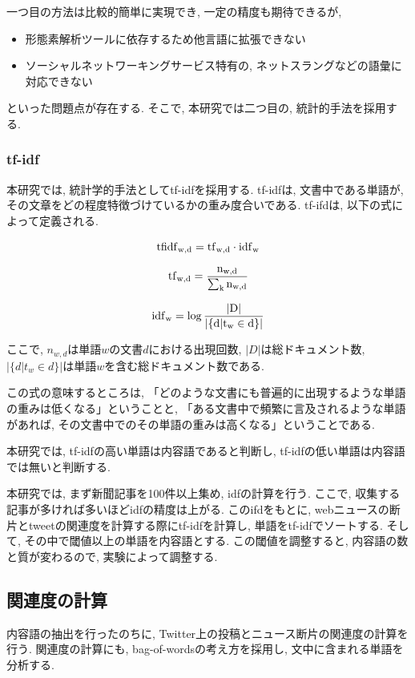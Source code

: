 \documentclass[12pt]{jarticle}
\begin{document}
一つ目の方法は比較的簡単に実現でき, 一定の精度も期待できるが, 
\begin{itemize}
  \item 形態素解析ツールに依存するため他言語に拡張できない
  \item ソーシャルネットワーキングサービス特有の, ネットスラングなどの語彙に対応できない
\end{itemize}
といった問題点が存在する. そこで, 本研究では二つ目の, 統計的手法を採用する. 

\subsubsection{tf-idf}
本研究では, 統計学的手法としてtf-idf\cite{tfidf}を採用する. tf-idfは, 文書中である単語が, その文章をどの程度特徴づけているかの重み度合いである. tf-ifdは, 以下の式によって定義される. 

\begin{equation}
  \rm{tfidf}_{w,d} = \rm{tf}_{w,d} \cdot \rm{idf}_{w}
\end{equation}

\begin{equation}
  \rm{tf}_{w, d} = \frac{n_{w,d}}{\sum_k n_{w,d}}
\end{equation}

\begin{equation}
  \rm{idf}_{w} = \log{\frac{|D|}{|\{d|t_w \in d\}|}}
\end{equation}

ここで, $n_{w,d}$は単語$w$の文書$d$における出現回数, $|D|$は総ドキュメント数, $|\{d|t_w \in d\}|$は単語$w$を含む総ドキュメント数である. 

この式の意味するところは, 「どのような文書にも普遍的に出現するような単語の重みは低くなる」ということと, 「ある文書中で頻繁に言及されるような単語があれば, その文書中でのその単語の重みは高くなる」ということである. 

本研究では, tf-idfの高い単語は内容語であると判断し, tf-idfの低い単語は内容語では無いと判断する. 

本研究では, まず新聞記事を100件以上集め, idfの計算を行う. ここで, 収集する記事が多ければ多いほどidfの精度は上がる. このifdをもとに, webニュースの断片とtweetの関連度を計算する際にtf-idfを計算し, 単語をtf-idfでソートする. そして, その中で閾値以上の単語を内容語とする. この閾値を調整すると, 内容語の数と質が変わるので, 実験によって調整する. 

\subsection{関連度の計算}
内容語の抽出を行ったのちに, Twitter上の投稿とニュース断片の関連度の計算を行う. 関連度の計算にも, bag-of-wordsの考え方を採用し, 文中に含まれる単語を分析する. 
\end{document}
